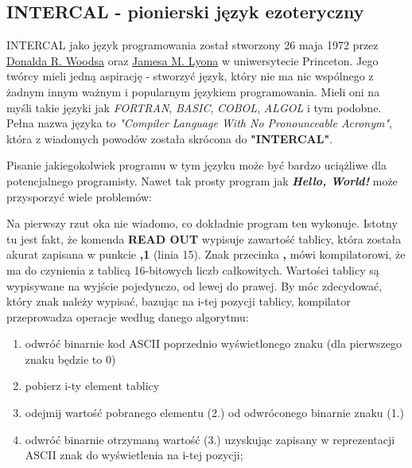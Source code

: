 \documentclass[fleqn,10pt]{SelfArx} %
\begin{document}
\subsection{INTERCAL - pionierski język ezoteryczny}
INTERCAL jako język programowania został stworzony 26 maja 1972 przez \underline{Donalda R. Woodsa} oraz
\underline{Jamesa M. Lyona} w uniwersytecie Princeton. Jego twórcy mieli jedną aspirację - stworzyć
język, który nie ma nic wspólnego z żadnym innym ważnym i popularnym językiem programowania.
Mieli oni na myśli takie języki jak \textit{FORTRAN}, \textit{BASIC}, \textit{COBOL}, \textit{ALGOL} i tym podobne.
Pełna nazwa języka to \textit{"Compiler Language With No Pronounceable Acronym"}, która z wiadomych powodów została skrócona do
\textbf{"INTERCAL"}\cite{woods1973intercal}.
\par Pisanie jakiegokolwiek programu w tym języku może być bardzo uciążliwe dla potencjalnego programisty. Nawet tak prosty program jak
\textbf{\textit{Hello, World!}} może przysporzyć wiele problemów:
Na pierwszy rzut oka nie wiadomo, co dokładnie program ten wykonuje.
Istotny tu jest fakt, że komenda \textbf{READ OUT} wypisuje zawartość tablicy, która została akurat zapisana w punkcie \textbf{,1} (linia 15).
Znak przecinka \textbf{,} mówi kompilatorowi, że ma do czynienia z tablicą 16-bitowych liczb całkowitych. Wartości tablicy są wypisywane na wyjście
pojedynczo, od lewej do prawej. By móc zdecydować, który znak należy wypisać, bazując na i-tej pozycji tablicy, 
kompilator przeprowadza operacje według danego algorytmu\cite{intercal:algorithm}:
\begin{enumerate}
	\item odwróć binarnie kod ASCII poprzednio wyświetlonego znaku (dla pierwszego znaku będzie to 0)
	\item pobierz i-ty element tablicy
	\item odejmij wartość pobranego elementu (2.) od odwróconego binarnie znaku (1.)
	\item odwróć binarnie otrzymaną wartość (3.) uzyskując zapisany w reprezentacji ASCII znak do wyświetlenia na i-tej pozycji;
\end{enumerate}
\end{document}
